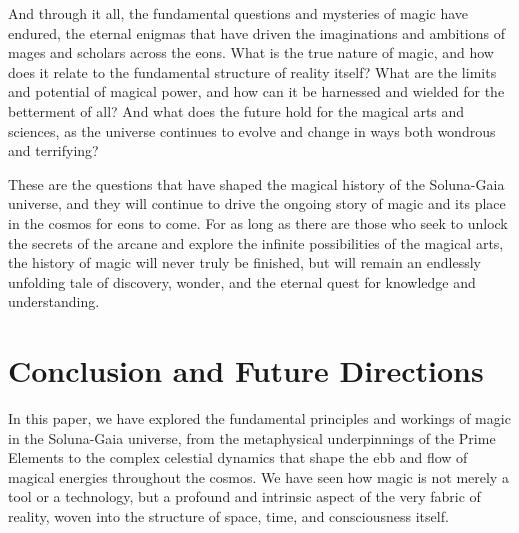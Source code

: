 \documentclass[12pt]{article}
\begin{document}
And through it all, the fundamental questions and mysteries of magic have endured, the eternal enigmas that have driven the imaginations and ambitions of mages and scholars across the eons. What is the true nature of magic, and how does it relate to the fundamental structure of reality itself? What are the limits and potential of magical power, and how can it be harnessed and wielded for the betterment of all? And what does the future hold for the magical arts and sciences, as the universe continues to evolve and change in ways both wondrous and terrifying?

These are the questions that have shaped the magical history of the Soluna-Gaia universe, and they will continue to drive the ongoing story of magic and its place in the cosmos for eons to come. For as long as there are those who seek to unlock the secrets of the arcane and explore the infinite possibilities of the magical arts, the history of magic will never truly be finished, but will remain an endlessly unfolding tale of discovery, wonder, and the eternal quest for knowledge and understanding.


% 

\section{Conclusion and Future Directions}

In this paper, we have explored the fundamental principles and workings of magic in the Soluna-Gaia universe, from the metaphysical underpinnings of the Prime Elements to the complex celestial dynamics that shape the ebb and flow of magical energies throughout the cosmos. We have seen how magic is not merely a tool or a technology, but a profound and intrinsic aspect of the very fabric of reality, woven into the structure of space, time, and consciousness itself.
\end{document}
